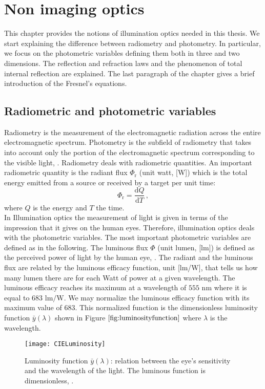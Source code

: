 \chapter{Non imaging optics}
This chapter provides the notions of illumination optics needed in this thesis. We start explaining the difference between radiometry and photometry.
In particular, we focus on the photometric variables defining them both in three and two dimensions. The reflection and refraction laws and the phenomenon of total internal reflection are explained. The last paragraph of the chapter gives a brief introduction of the Fresnel's equations. 
\section{Radiometric and photometric variables}
Radiometry is the measurement of the electromagnetic radiation across the entire electromagnetic spectrum. Photometry is the subfield of radiometry that takes into account only the portion of the electromagnetic spectrum corresponding to the visible light, \cite{zalewski1995radiometry}. Radiometry deals with radiometric quantities. An important radiometric quantity  is the radiant flux $\Phi_{\textrm{r}}$ (unit watt, [\textrm{W}]) which is the total energy emitted from a source or received by a target per unit time:
\begin{equation}
\Phi_{\textrm{r}} = \frac{\textrm{d}Q}{\textrm{d}T}\,,
\end{equation}
where $Q$ is the energy and $T$ the time.\\
\indent In Illumination optics the measurement of light is given in terms of the impression that it gives on the human eyes. Therefore, illumination optics deals with the photometric variables. The most important photometric variables are defined as in the following. The luminous flux $\Phi$ (unit lumen, [\textrm{lm}]) is defined as the perceived power of light by the human eye, \cite{chaves2015introduction}.
 The radiant and the luminous flux are related by the luminous efficacy function, unit [lm/W], that tells us how many lumen there are for each Watt of power at a given wavelength.
 The luminous efficacy reaches its maximum  at a wavelength of $555$ $\textrm{nm}$ where it is equal to $683$ $\textrm{lm}/\textrm{W}$.
  We may normalize the luminous efficacy function with its maximum value of $683$.
  This normalized function is the dimensionless luminosity function $\bar{y}(\lambda)$ shown in Figure $\ref{fig:luminosityfunction}$ where $\lambda$ is the wavelength.
\begin{figure}[h]
  \begin{center}
  \texttt{[image: CIELuminosity]}
  \end{center}
  \caption{Luminosity function $\bar{y}(\lambda)$: relation between the eye's sensitivity and the wavelength of the light. The luminous function is dimensionless, \cite{wiki}.}
  \label{fig:luminosityfunction}
  \end{figure}
